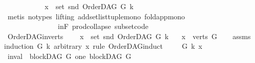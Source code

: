 \begin{isabellebody}
\ \ \ \ \ \ \ \ \isamarkupfalse%
\ \isamarkupfalse%
\ {\isachardoublequoteopen}x\ {\isasymin}\ set\ {\isacharparenleft}{\kern0pt}snd\ {\isacharparenleft}{\kern0pt}OrderDAG\ G\ k{\isacharparenright}{\kern0pt}{\isacharparenright}{\kern0pt}{\isachardoublequoteclose}\isanewline
\ \ \ \ \ \ \ \ \ \ \isamarkupfalse%
\ {\isacharparenleft}{\kern0pt}metis\ {\isacharparenleft}{\kern0pt}no{\isacharunderscore}{\kern0pt}types{\isacharcomma}{\kern0pt}\ lifting{\isacharparenright}{\kern0pt}\ add{\isacharunderscore}{\kern0pt}set{\isacharunderscore}{\kern0pt}list{\isacharunderscore}{\kern0pt}tuple{\isacharunderscore}{\kern0pt}mono\ fold{\isacharunderscore}{\kern0pt}app{\isacharunderscore}{\kern0pt}mono{}\isanewline
\ \ \ \ \ \ \ \ \ \ \ \ \ \ \ in{\isacharunderscore}{\kern0pt}F\ prod{\isachardot}{\kern0pt}collapse\ subset{\isacharunderscore}{\kern0pt}code{\isacharparenleft}{\kern0pt}{}{\isacharparenright}{\kern0pt}{\isacharparenright}{\kern0pt}\ \ \isanewline
\ \ \ \ \ \ \isamarkupfalse%
\isanewline
\ \ \ \ \isamarkupfalse%
\isanewline
\ \ \isamarkupfalse%
\isanewline
{}\isamarkupfalse%
%
\endisatagproof
{\isafoldproof}%
%
\isadelimproof
\isanewline
%
\endisadelimproof
\isanewline
\isanewline
{}\isamarkupfalse%
\ OrderDAG{\isacharunderscore}{\kern0pt}in{\isacharunderscore}{\kern0pt}verts{\isacharcolon}{\kern0pt}\ \isanewline
\ \ \ {\isachardoublequoteopen}x\ {\isasymin}\ set\ {\isacharparenleft}{\kern0pt}snd\ {\isacharparenleft}{\kern0pt}OrderDAG\ G\ k{\isacharparenright}{\kern0pt}{\isacharparenright}{\kern0pt}{\isachardoublequoteclose}\isanewline
\ \ \ {\isachardoublequoteopen}x\ {\isasymin}\ verts\ G{\isachardoublequoteclose}\isanewline
%
\isadelimproof
\ \ %
\endisadelimproof
%
\isatagproof
{}\isamarkupfalse%
\ assms\isanewline
{}\isamarkupfalse%
{\isacharparenleft}{\kern0pt}induction\ G\ k\ arbitrary{\isacharcolon}{\kern0pt}\ x\ rule{\isacharcolon}{\kern0pt}\ OrderDAG{\isachardot}{\kern0pt}induct{\isacharparenright}{\kern0pt}\isanewline
\ \ \isamarkupfalse%
\ {\isacharparenleft}{\kern0pt}{}\ G\ k\ x{\isacharparenright}{\kern0pt}\isanewline
\ \ \isamarkupfalse%
\ {\isacharparenleft}{\kern0pt}inval{\isacharparenright}{\kern0pt}\ {\isachardoublequoteopen}{\isasymnot}\ blockDAG\ G{\isachardoublequoteclose}{\isacharbar}{\kern0pt}\ {\isacharparenleft}{\kern0pt}one{\isacharparenright}{\kern0pt}\ {\isachardoublequoteopen}blockDAG\ G\ {\isasymand}\isanewline

\end{isabellebody}
